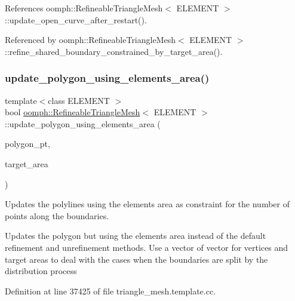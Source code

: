 References oomph\+::\+Refineable\+Triangle\+Mesh$<$ E\+L\+E\+M\+E\+N\+T $>$\+::update\+\_\+open\+\_\+curve\+\_\+after\+\_\+restart().



Referenced by oomph\+::\+Refineable\+Triangle\+Mesh$<$ E\+L\+E\+M\+E\+N\+T $>$\+::refine\+\_\+shared\+\_\+boundary\+\_\+constrained\+\_\+by\+\_\+target\+\_\+area().

\mbox{\label{classoomph_1_1RefineableTriangleMesh_aebc1eb8c96cac1b50cacbe317351e3fb}} 
\subsubsection{\texorpdfstring{update\+\_\+polygon\+\_\+using\+\_\+elements\+\_\+area()}{update\_polygon\_using\_elements\_area()}}
{\footnotesize\ttfamily template$<$class E\+L\+E\+M\+E\+NT $>$ \\
bool \hyperlink{classoomph_1_1RefineableTriangleMesh}{oomph\+::\+Refineable\+Triangle\+Mesh}$<$ E\+L\+E\+M\+E\+NT $>$\+::update\+\_\+polygon\+\_\+using\+\_\+elements\+\_\+area (\begin{DoxyParamCaption}\item[{Triangle\+Mesh\+Polygon $\ast$\&}]{polygon\+\_\+pt,  }\item[{const Vector$<$ double $>$ \&}]{target\+\_\+area }\end{DoxyParamCaption})\hspace{0.3cm}{\ttfamily [protected]}}



Updates the polylines using the elements area as constraint for the number of points along the boundaries. 

Updates the polygon but using the elements area instead of the default refinement and unrefinement methods. Use a vector of vector for vertices and target areas to deal with the cases when the boundaries are split by the distribution process 

Definition at line 37425 of file triangle\+\_\+mesh.\+template.\+cc.



